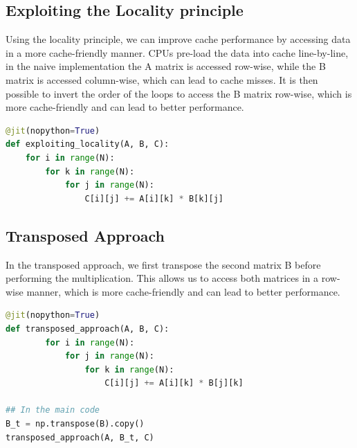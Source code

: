 \documentclass[11pt,a4paper]{article}
\begin{document}
\subsection{Exploiting the Locality principle}
Using the locality principle, we can improve cache performance by accessing data in a more cache-friendly manner. 
CPUs pre-load the data into cache line-by-line, in the naive implementation the A matrix is accessed row-wise, while the B matrix is accessed column-wise, which can lead to cache misses.
It is then possible to invert the order of the loops to access the B matrix row-wise, which is more cache-friendly and can lead to better performance.

\begin{lstlisting}[language=Python, caption={Baseline Naive CPU Matrix Multiplication with Locality Principle in Python}, label={lst:cpu_locality}]
@jit(nopython=True)
def exploiting_locality(A, B, C):
    for i in range(N):
        for k in range(N):
            for j in range(N):
                C[i][j] += A[i][k] * B[k][j]
\end{lstlisting}

\subsection{Transposed Approach}
In the transposed approach, we first transpose the second matrix B before performing the multiplication.
This allows us to access both matrices in a row-wise manner, which is more cache-friendly and can lead to better performance.
\begin{lstlisting}[language=Python, caption={Baseline Naive CPU Matrix Multiplication with Locality Principle in Python}, label={lst:cpu_locality_1}]
@jit(nopython=True)
def transposed_approach(A, B, C):
        for i in range(N):
            for j in range(N):
                for k in range(N):
                    C[i][j] += A[i][k] * B[j][k]

## In the main code
B_t = np.transpose(B).copy()
transposed_approach(A, B_t, C)

\end{lstlisting}
\end{document}
